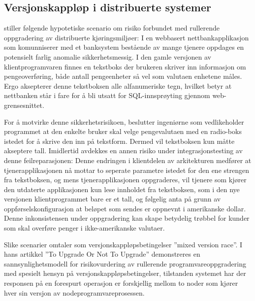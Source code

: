 \subsection{Versjonskappløp i distribuerte systemer}

\citep{dumitras2010upgrade} stiller følgende hypotetiske scenario om risiko forbundet med rullerende oppgradering av distribuerte kjøringsmiljøer: I en webbasert nettbankapplikasjon som komunniserer med et banksystem bestående av mange tjenere oppdages en potensielt farlig anomalie sikkerhetsmessig. I den gamle versjonen av klientprogramvaren finnes en tekstboks der brukeren skriver inn informasjon om pengeoverføring, både antall pengeenheter så vel som valutaen enhetene måles. Ergo aksepterer denne tekstboksen alle alfanumeriske tegn, hvilket betyr at nettbanken står i fare for å bli utsatt for SQL-innsprøyting gjennom web-grensesnittet.

For å motvirke denne sikkerhetsrisikoen, beslutter ingeniørne som vedlikeholder programmet at den enkelte bruker skal velge pengevalutaen med en radio-boks istedet for å skrive den inn på tekstform. Dermed vil tekstboksen kun måtte akseptere tall. Imidlertid avdekkes en annen risiko under integrasjonstesting av denne feilreparasjonen: Denne endringen i klientdelen av arkitekturen medfører at tjenerapplikasjonen nå mottar to seperate parametre istedet for den ene strengen fra tekstboksen, og mens tjenerapplikasjonen oppgraderes, vil tjenere som kjører den utdaterte applikasjonen kun lese innholdet fra tekstboksen, som i den nye versjonen klientprogrammet bare er et tall, og følgelig anta på grunn av oppførselskonfigurasjon at beløpet som sendes er oppnevnt i amerikanske dollar. Denne inkonsistensen under oppgradering kan skape betydelig trøbbel for kunder som skal overføre penger i ikke-amerikanske valutaer.

Slike scenarier omtaler \citep{dumitras2010upgrade} som versjonskappløpsbetingelser ''mixed version race''. I hans artikkel ''To Upgrade Or Not To Upgrade'' demonstreres en sannsynlighetsmodell for risikovurdering av rullerende programvareoppgradering med spesielt hensyn på versjonskappløpsbetingelser, tilstanden systemet har der responsen på en forespurt operasjon er forskjellig mellom to noder som kjører hver sin versjon av nodeprogramvareprosessen.
